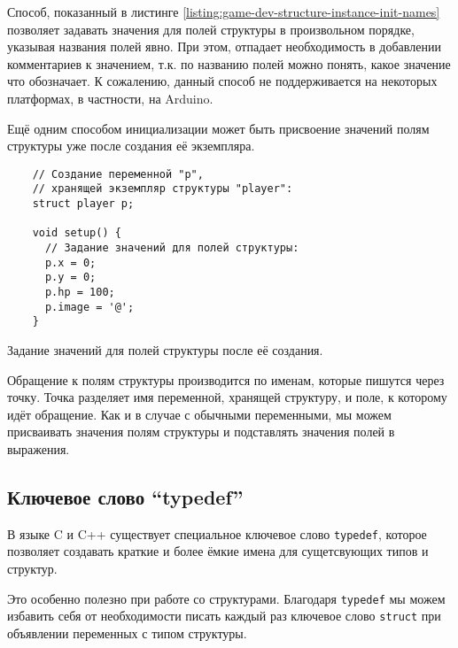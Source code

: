 \documentclass[../sparc.tex]{subfiles}
\begin{document}
Способ, показанный в листинге
\ref{listing:game-dev-structure-instance-init-names} позволяет задавать значения
для полей структуры в произвольном порядке, указывая названия полей явно.  При
этом, отпадает необходимость в добавлении комментариев к значением, т.к. по
названию полей можно понять, какое значение что обозначает.  К сожалению, данный
способ не поддерживается на некоторых платформах, в частности, на Arduino.

Ещё одним способом инициализации может быть присвоение значений полям структуры
уже после создания её экземпляра.

\begin{listing}[H]
  \begin{verbatim}
    // Создание переменной "p",
    // хранящей экземпляр структуры "player":
    struct player p;

    void setup() {
      // Задание значений для полей структуры:
      p.x = 0;
      p.y = 0;
      p.hp = 100;
      p.image = '@';
    }
  \end{verbatim}
  \caption{Задание значений для полей структуры после её создания.}
  \label{listing:game-dev-structure-assignment}
\end{listing}

Обращение к полям структуры производится по именам, которые пишутся через точку.
Точка разделяет имя переменной, хранящей структуру, и поле, к которому идёт
обращение.  Как и в случае с обычными переменными, мы можем присваивать значения
полям структуры и подставлять значения полей в выражения.

\subsection{Ключевое слово ``typedef''}

В языке C и C++ существует специальное ключевое слово \texttt{typedef},
которое позволяет создавать краткие и более ёмкие имена для сущетсвующих типов и
структур.

Это особенно полезно при работе со структурами.  Благодаря
\texttt{typedef} мы можем избавить себя от необходимости писать каждый
раз ключевое слово \texttt{struct} при объявлении переменных с типом
структуры.
\end{document}
